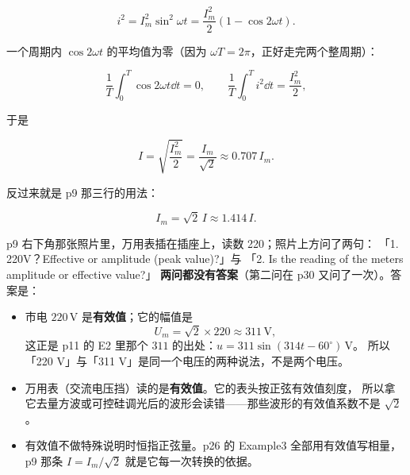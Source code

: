 \documentclass[11pt]{ctexart}
\begin{document}
\[ i^2=I_m^2\sin^2\omega t=\frac{I_m^2}{2}\left(1-\cos2\omega t\right) . \]

一个周期内 $\cos2\omega t$ 的平均值为零（因为 $\omega T=2\pi$，正好走完两个整周期）：

\[ \frac{1}{T}\int_0^T\cos2\omega t\dd t=0 ,\qquad
   \frac{1}{T}\int_0^T i^2\dd t=\frac{I_m^2}{2} , \]

于是

\[ I=\sqrt{\frac{I_m^2}{2}}=\frac{I_m}{\sqrt2}\approx0.707\,I_m . \]

反过来就是 p9 那三行的用法：

\[ I_m=\sqrt2\,I\approx1.414\,I . \]




p9 右下角那张照片里，万用表插在插座上，读数 220；照片上方问了两句：
「1. 220V？Effective or amplitude (peak value)?」与
「2. Is the reading of the meters amplitude or effective value?」
\textbf{两问都没有答案}（第二问在 p30 又问了一次）。答案是：

\begin{itemize}
\item 市电 $220\,\mathrm{V}$ 是\textbf{有效值}；它的幅值是
\[ U_m=\sqrt2\times220\approx311\,\mathrm{V} , \]
这正是 p11 的 E2 里那个 $311$ 的出处：$u=311\sin(314t-60^\circ)\,\mathrm{V}$。
所以「220 V」与「311 V」是同一个电压的两种说法，不是两个电压。
\item 万用表（交流电压挡）读的是\textbf{有效值}。它的表头按正弦有效值刻度，
所以拿它去量方波或可控硅调光后的波形会读错——那些波形的有效值系数不是 $\sqrt2$。
\item 有效值不做特殊说明时恒指正弦量。p26 的 Example3 全部用有效值写相量，
p9 那条 $I=I_m/\sqrt2$ 就是它每一次转换的依据。
\end{itemize}


\end{document}
